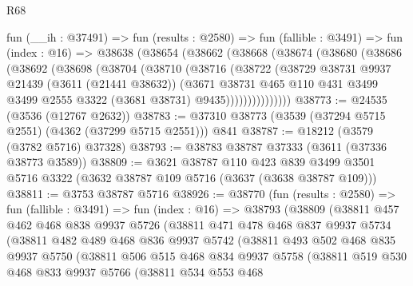 \begin{lexlean}{R68}
\begin{coremodule}
    fun (__ih : @37491) =>
    fun (results : @2580) =>
    fun (fallible : @3491) =>
    fun (index : @16) =>
    @38638
      (@38654
        (@38662
          (@38668
            (@38674
              (@38680
                (@38686
                  (@38692
                    (@38698
                      (@38704
                        (@38710
                          (@38716
                            (@38722
                              (@38729
                                @38731
                                @9937
                                @21439
                                (@3611 (@21441 @38632))
                                (@3671
                                  @38731
                                  @465
                                  @110
                                  @431
                                  @3499
                                  @3499
                                  @2555
                                  @3322
                                  (@3681 @38731)
                                  @9435)))))))))))))))
@38773 := @24535 (@3536 (@12767 @2632))
@38783 := @37310 @38773 (@3539 (@37294 @5715 @2551) (@4362 (@37299 @5715 @2551))) @841
@38787 := @18212 (@3579 (@3782 @5716) @37328)
@38793 := @38783 @38787 @37333 (@3611 (@37336 @38773 @3589))
@38809 := @3621
    @38787
    @110
    @423
    @839
    @3499
    @3501
    @5716
    @3322
    (@3632 @38787 @109 @5716 (@3637 (@3638 @38787 @109)))
@38811 := @3753 @38787 @5716
@38926 := @38770
    (fun (results : @2580) =>
    fun (fallible : @3491) =>
    fun (index : @16) =>
    @38793
      (@38809
        (@38811
          @457
          @462
          @468
          @838
          @9937
          @5726
          (@38811
            @471
            @478
            @468
            @837
            @9937
            @5734
            (@38811
              @482
              @489
              @468
              @836
              @9937
              @5742
              (@38811
                @493
                @502
                @468
                @835
                @9937
                @5750
                (@38811
                  @506
                  @515
                  @468
                  @834
                  @9937
                  @5758
                  (@38811
                    @519
                    @530
                    @468
                    @833
                    @9937
                    @5766
                    (@38811
                      @534
                      @553
                      @468

\end{coremodule}
\end{lexlean}
